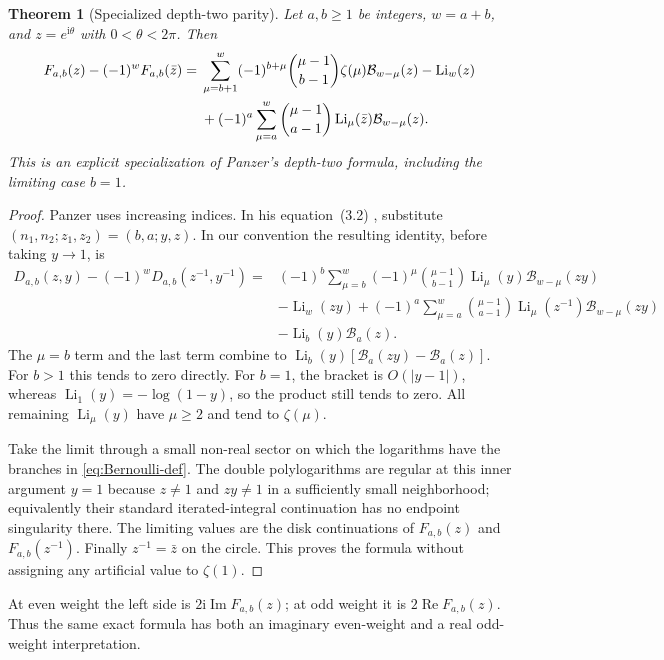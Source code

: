 \documentclass[11pt,a4paper]{article}
\numberwithin{equation}{section}
\newtheorem{theorem}{Theorem}[section]
\theoremstyle{definition}
\theoremstyle{remark}
\newcommand{\Li}{\operatorname{Li}}
\newcommand{\Imag}{\operatorname{Im}}
\newcommand{\Real}{\operatorname{Re}}
\newcommand{\ii}{\mathrm{i}}
\newcommand{\BB}{\mathcal B}
\begin{document}
\begin{theorem}[Specialized depth-two parity]\label{thm:parity}
Let $a,b\ge1$ be integers, $w=a+b$, and $z=e^{\ii\theta}$ with $0<\theta<2\pi$. Then
\begin{align}\label{eq:parity-master}
 F_{a,b}(z)-(-1)^wF_{a,b}(\bar z)
 ={}&\sum_{\mu=b+1}^{w}(-1)^{b+\mu}
       \binom{\mu-1}{b-1}\zeta(\mu)\BB_{w-\mu}(z)
       -\Li_w(z)\notag\\
 &+(-1)^a\sum_{\mu=a}^{w}\binom{\mu-1}{a-1}
       \Li_\mu(\bar z)\BB_{w-\mu}(z).
\end{align}
This is an explicit specialization of Panzer's depth-two formula, including the limiting case $b=1$.
\end{theorem}
\begin{proof}
Panzer uses increasing indices. In his equation~(3.2) \cite{Panzer}, substitute
$(n_1,n_2;z_1,z_2)=(b,a;y,z)$. In our convention the resulting identity, before taking $y\to1$, is
\begin{align*}
 D_{a,b}(z,y)-(-1)^wD_{a,b}(z^{-1},y^{-1})
 ={}&(-1)^b\sum_{\mu=b}^{w}(-1)^\mu\binom{\mu-1}{b-1}
       \Li_\mu(y)\BB_{w-\mu}(zy)\\
 &-\Li_w(zy)
  +(-1)^a\sum_{\mu=a}^{w}\binom{\mu-1}{a-1}
       \Li_\mu(z^{-1})\BB_{w-\mu}(zy)\\
 &-\Li_b(y)\BB_a(z).
\end{align*}
The $\mu=b$ term and the last term combine to
$\Li_b(y)[\BB_a(zy)-\BB_a(z)]$. For $b>1$ this tends to zero directly. For $b=1$, the bracket is $O(|y-1|)$, whereas $\Li_1(y)=-\log(1-y)$, so the product still tends to zero. All remaining $\Li_\mu(y)$ have $\mu\ge2$ and tend to $\zeta(\mu)$.

Take the limit through a small non-real sector on which the logarithms have the branches in \eqref{eq:Bernoulli-def}. The double polylogarithms are regular at this inner argument $y=1$ because $z\ne1$ and $zy\ne1$ in a sufficiently small neighborhood; equivalently their standard iterated-integral continuation has no endpoint singularity there. The limiting values are the disk continuations of $F_{a,b}(z)$ and $F_{a,b}(z^{-1})$. Finally $z^{-1}=\bar z$ on the circle. This proves the formula without assigning any artificial value to $\zeta(1)$.
\end{proof}

At even weight the left side is $2\ii\Imag F_{a,b}(z)$; at odd weight it is $2\Real F_{a,b}(z)$. Thus the same exact formula has both an imaginary even-weight and a real odd-weight interpretation.
\end{document}
